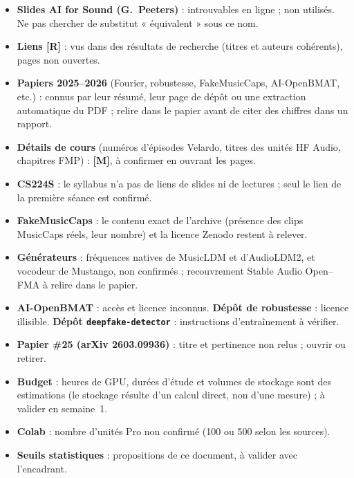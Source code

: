 \documentclass[11pt,a4paper]{article}
\newcommand{\sR}{\textbf{[R]}}
\newcommand{\sM}{\textbf{[M]}}
\begin{document}
\begin{itemize}
  \item \textbf{Slides AI for Sound (G.~Peeters)} : introuvables en ligne ; non utilisés. Ne pas chercher de substitut « équivalent » sous ce nom.
  \item \textbf{Liens \sR} : vus dans des résultats de recherche (titres et auteurs cohérents), pages non ouvertes.
  \item \textbf{Papiers 2025--2026} (Fourier, robustesse, FakeMusicCaps, AI-OpenBMAT, etc.) : connus par leur résumé, leur page de dépôt ou une extraction automatique du PDF ; relire dans le papier avant de citer des chiffres dans un rapport.
  \item \textbf{Détails de cours} (numéros d'épisodes Velardo, titres des unités HF Audio, chapitres FMP) : \sM, à confirmer en ouvrant les pages.
  \item \textbf{CS224S} : le syllabus n'a pas de liens de slides ni de lectures ; seul le lien de la première séance est confirmé.
  \item \textbf{FakeMusicCaps} : le contenu exact de l'archive (présence des clips MusicCaps réels, leur nombre) et la licence Zenodo restent à relever.
  \item \textbf{Générateurs} : fréquences natives de MusicLDM et d'AudioLDM2, et vocodeur de Mustango, non confirmés ; recouvrement Stable Audio Open--FMA à relire dans le papier.
  \item \textbf{AI-OpenBMAT} : accès et licence inconnus. \textbf{Dépôt de robustesse} : licence illisible. \textbf{Dépôt \texttt{deepfake-detector}} : instructions d'entraînement à vérifier.
  \item \textbf{Papier \#25 (arXiv 2603.09936)} : titre et pertinence non relus ; ouvrir ou retirer.
  \item \textbf{Budget} : heures de GPU, durées d'étude et volumes de stockage sont des estimations (le stockage résulte d'un calcul direct, non d'une mesure) ; à valider en semaine~1.
  \item \textbf{Colab} : nombre d'unités Pro non confirmé (100 ou 500 selon les sources).
  \item \textbf{Seuils statistiques} : propositions de ce document, à valider avec l'encadrant.
\end{itemize}
\end{document}
